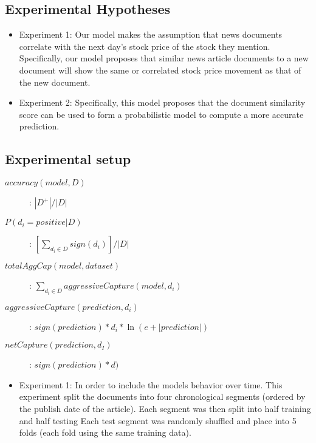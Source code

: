 \documentclass[11pt,letterpaper]{article}
\newcommand{\blue}[1]{\textcolor{RoyalBlue}{#1}}
\newcommand{\instructions}[1]{\blue{\textit{#1}}}
\begin{document}
\subsection{Experimental Hypotheses}
\label{sec:exper-hypoth}
\begin{itemize}
  \item Experiment 1: Our model makes the assumption that news documents
  correlate with the next day's stock price of the stock they mention.
  Specifically, our model proposes that similar news article documents to a new
  document will show the same or correlated stock price movement as that of the new document.
  \item Experiment 2: Specifically, this model proposes that the
  document similarity score can be used to form a probabilistic model to compute
  a more accurate prediction.
\end{itemize}

\subsection{Experimental setup}
\label{sec:experimental-setup}
\begin{description}
  \item[\(accuracy(model, D)\)] : \(|D^+| / |D|\)
  \item[\(P(d_i = positive | D)\)] : \([\sum_{d_i \in D} sign(d_i)] / |D|\)
  \item[\(totalAggCap(model, dataset)\)] : \(\sum_{d_i \in D} aggressiveCapture(model, d_i) \)
  \item[\(aggressiveCapture(prediction, d_i)\)] : \(sign(prediction) * d_i * \ln(e + |prediction|) \)
  \item[\(netCapture(prediction, d_I)\)] : \(sign(prediction) * d)\)
\end{description}

\begin{itemize}
  \item Experiment 1: In order to include the models behavior over time.
  This experiment split the documents into four chronological
  segments (ordered by the publish date of the article).
  Each segment was then split into half training and half testing
  Each test segment was randomly shuffled and place into 5 folds (each fold
  using the same training data).
\end{itemize}
\end{document}

